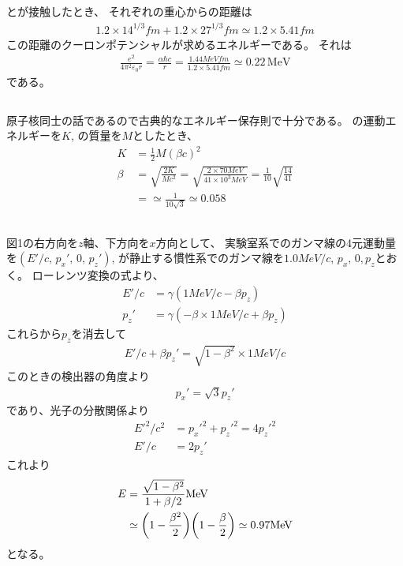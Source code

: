 \documentclass[../../master.tex]{subfiles}
\begin{document}
\subsection{}
とが接触したとき、
それぞれの重心からの距離は
\begin{align}
    1.2\times 14^{1/3} \si{fm} +1.2\times 27^{1/3}\si{fm} \simeq 1.2 \times 5.41 \si{fm}
\end{align}
この距離のクーロンポテンシャルが求めるエネルギーである。
それは
\begin{align}
    \frac{e^2}{4\pi^2\varepsilon_0 r} = \frac{\alpha \hbar c}{r}
    = \frac{1.44 \si{MeV fm}}{1.2\times 5.41 \si {fm}}\simeq 0.22 \,\text{MeV}
\end{align}
である。
\subsection{}
原子核同士の話であるので古典的なエネルギー保存則で十分である。
の運動エネルギーを\(K\), の質量を\(M\)としたとき、
\begin{align}
    K &= \frac{1}{2}M(\beta c)^2\\
    \beta &= \sqrt{\frac{2K}{Mc^2}} = \sqrt{\frac{2\times 70 \si{MeV}}{41\times 10^3 \si{MeV}}}
        = \frac{1}{10}\sqrt{\frac{14}{41}}\\
    &=\simeq \frac{1}{10\sqrt3} \simeq 0.058
\end{align}

\subsection{}
図1の右方向を\(z\)軸、下方向を\(x\)方向として、
実験室系でのガンマ線の4元運動量を\((E'/c,\,p_x',\,0,\,p_z')\),
が静止する慣性系でのガンマ線を\(1.0\si{MeV/c},\,p_x,\,0,p_z\)とおく。
ローレンツ変換の式より、
\begin{align}
    E'/c &= \gamma(1\si{MeV/c}-\beta p_z)\\
    p_z' &= \gamma(-\beta\times 1\si{MeV/c} +\beta p_z)
\end{align}
これらから\(p_z\)を消去して
\begin{align}
    E'/c + \beta p_z' = \sqrt{1-\beta^2} \times 1\si{MeV/c}
\end{align}
このときの検出器の角度より
\begin{align}
    p_x' = \sqrt{3} p_z'
\end{align}
であり、光子の分散関係より
\begin{align}
    E'^2/c^2 &= p_x'^2 + p_z'^2 = 4p_z'^2\\
    E'/c &= 2p_z'
\end{align}
これより
\begin{align}
    E &= \frac{\sqrt{1-\beta^2}}{1+\beta/2} \si{MeV}\\
    &\simeq \qty(1-\frac{\beta^2}{2})\qty(1-\frac{\beta}{2}) \simeq 0.97 \si{MeV}
\end{align}
となる。
\end{document}
